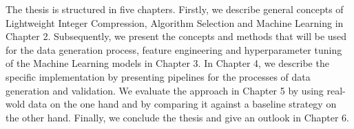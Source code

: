 The thesis is structured in five chapters. Firstly, we describe general concepts of Lightweight Integer Compression, Algorithm Selection and Machine Learning in Chapter 2. Subsequently, we present the concepts and methods that will be used for the data generation process, feature engineering and hyperparameter tuning of the Machine Learning models in Chapter 3. In Chapter 4, we describe the specific implementation by presenting pipelines for the processes of data generation and validation. We evaluate the approach in Chapter 5 by using real-wold data on the one hand and by comparing it against a baseline strategy on the other hand. Finally, we conclude the thesis and give an outlook in Chapter 6. 